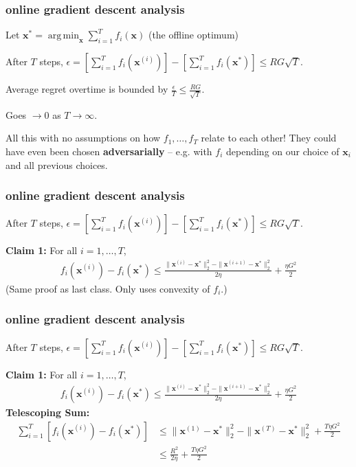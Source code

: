 \documentclass[compress]{beamer}
\newcommand{\bv}[1]{\mathbf{#1}}
\DeclareMathOperator*{\argmin}{arg\,min}
\begin{document}
\begin{frame}[t]
	\frametitle{online gradient descent analysis} 
Let $\bv{x}^{*} = \argmin_\bv{x}\sum_{i=1}^T f_i(\bv{x})$ (the offline optimum)
	\begin{theorem}
		After $T$ steps, $\epsilon = \left[\sum_{i=1}^T f_i(\bv{x}^{(i)})\right] - \left[\sum_{i=1}^T f_i(\bv{x}^*)\right] \leq RG\sqrt{T}$.
	\end{theorem}
	Average regret overtime is bounded by $\frac{\epsilon}{T} \leq \frac{RG}{\sqrt{T}}$.
	
	Goes $\rightarrow 0$ as $T\rightarrow \infty$. 
	
	\begin{center}
		All this with no assumptions on how $f_1, \ldots, f_T$ relate to each other! They could have even been chosen \alert{\textbf{adversarially}} -- e.g. with $f_i$ depending on our choice of $\bv{x}_i$ and all previous choices. 
	\end{center}
\end{frame}

\begin{frame}[t]
	\frametitle{online gradient descent analysis}
	\begin{theorem}
		After $T$ steps, $\epsilon = \left[\sum_{i=1}^T f_i(\bv{x}^{(i)})\right] - \left[\sum_{i=1}^T f_i(\bv{x}^*)\right] \leq RG\sqrt{T}$.
	\end{theorem}
	\textbf{Claim 1:} For all $i = 1, \ldots, T$, 
	\begin{align*}
		f_i(\bv{x}^{(i)}) - f_i(\bv{x}^*) \leq \frac{\|\bv{x}^{(i)} - \bv{x}^*\|_2^2 - \|\bv{x}^{(i+1)} - \bv{x}^*\|_2^2}{2\eta} + \frac{\eta G^2}{2}
	\end{align*}
(Same proof as last class. Only uses convexity of $f_i$.)

\end{frame}

\begin{frame}[t]
	\frametitle{online gradient descent analysis}
	\begin{theorem}
		After $T$ steps, $\epsilon = \left[\sum_{i=1}^T f_i(\bv{x}^{(i)})\right] - \left[\sum_{i=1}^T f_i(\bv{x}^*)\right] \leq RG\sqrt{T}$.
	\end{theorem}
	\textbf{Claim 1:} For all $i = 1, \ldots, T$, 
	\begin{align*}
		f_i(\bv{x}^{(i)}) - f_i(\bv{x}^*) \leq \frac{\|\bv{x}^{(i)} - \bv{x}^*\|_2^2 - \|\bv{x}^{(i+1)} - \bv{x}^*\|_2^2}{2\eta} + \frac{\eta G^2}{2}
	\end{align*}
	\textbf{Telescoping Sum:} 
	\begin{align*}
		\sum_{i=1}^{T}\left[f_i(\bv{x}^{(i)}) - f_i(\bv{x}^*)\right] &\leq \|\bv{x}^{(1)}-\bv{x}^*\|_2^2 -\|\bv{x}^{(T)}-\bv{x}^*\|_2^2 + \frac{T\eta G^2}{2} \\ &\leq  \frac{R^2}{2\eta} + \frac{T\eta G^2}{2}
	\end{align*}
	
	
\end{frame}
\end{document}
